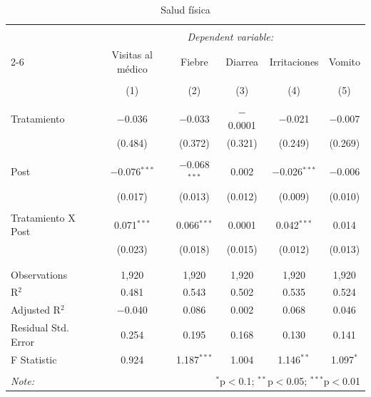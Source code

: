 
\begin{table}[H] \centering 
  \caption{Salud física} 
  \label{reg_fisico} 
\tiny 
\begin{tabular}{@{\extracolsep{-7pt}}lccccc} 
\\[-1.8ex]\hline 
\hline \\[-1.8ex] 
 & \multicolumn{5}{c}{\textit{Dependent variable:}} \\ 
\cline{2-6} 
 & Visitas al médico & Fiebre & Diarrea & Irritaciones & Vomito \\ 
\\[-1.8ex] & (1) & (2) & (3) & (4) & (5)\\ 
\hline \\[-1.8ex] 
 Tratamiento & $-$0.036 & $-$0.033 & $-$0.0001 & $-$0.021 & $-$0.007 \\ 
  & (0.484) & (0.372) & (0.321) & (0.249) & (0.269) \\ 
  & & & & & \\ 
 Post & $-$0.076$^{***}$ & $-$0.068$^{***}$ & 0.002 & $-$0.026$^{***}$ & $-$0.006 \\ 
  & (0.017) & (0.013) & (0.012) & (0.009) & (0.010) \\ 
  & & & & & \\ 
 Tratamiento X Post & 0.071$^{***}$ & 0.066$^{***}$ & 0.0001 & 0.042$^{***}$ & 0.014 \\ 
  & (0.023) & (0.018) & (0.015) & (0.012) & (0.013) \\ 
  & & & & & \\ 
\hline \\[-1.8ex] 
Observations & 1,920 & 1,920 & 1,920 & 1,920 & 1,920 \\ 
R$^{2}$ & 0.481 & 0.543 & 0.502 & 0.535 & 0.524 \\ 
Adjusted R$^{2}$ & $-$0.040 & 0.086 & 0.002 & 0.068 & 0.046 \\ 
Residual Std. Error & 0.254 & 0.195 & 0.168 & 0.130 & 0.141 \\ 
F Statistic & 0.924 & 1.187$^{***}$ & 1.004 & 1.146$^{**}$ & 1.097$^{*}$ \\ 
\hline 
\hline \\[-1.8ex] 
\textit{Note:}  & \multicolumn{5}{r}{$^{*}$p$<$0.1; $^{**}$p$<$0.05; $^{***}$p$<$0.01} \\ 
\end{tabular} 
\end{table} 
